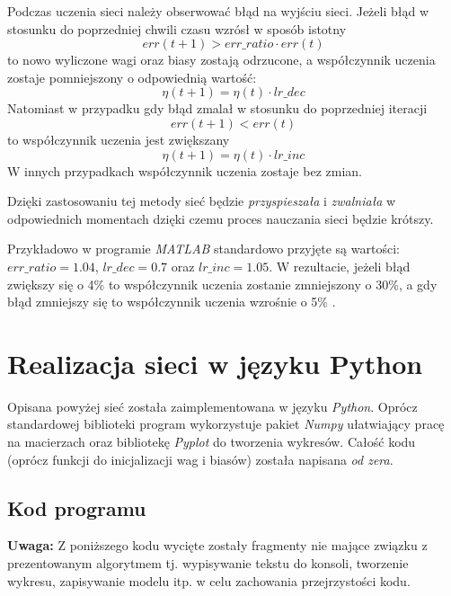 \documentclass[a4paper,12pt]{article}
\numberwithin{equation}{section}
\begin{document}
Podczas uczenia sieci należy obserwować błąd na wyjściu sieci. Jeżeli błąd w stosunku do poprzedniej chwili czasu wzrósł w sposób istotny
\begin{equation}
    err(t+1) > err\_ratio \cdot err(t)
\end{equation}
to nowo wyliczone wagi oraz biasy zostają odrzucone, a współczynnik uczenia zostaje pomniejszony o odpowiednią wartość:
\begin{equation}
    \eta(t+1) = \eta(t) \cdot lr\_dec
\end{equation}
Natomiast w przypadku gdy błąd zmalał w stosunku do poprzedniej iteracji
\begin{equation}
    err(t+1) < err(t)
\end{equation}
to współczynnik uczenia jest zwiększany
\begin{equation}
    \eta(t+1) = \eta(t) \cdot lr\_inc
\end{equation}
W innych przypadkach współczynnik uczenia zostaje bez zmian.

Dzięki zastosowaniu tej metody sieć będzie \textit{przyspieszała} i \textit{zwalniała} w odpowiednich momentach dzięki czemu proces nauczania sieci będzie krótszy.

Przykładowo w programie \textit{MATLAB} standardowo przyjęte są wartości:\\
$err\_ratio=1.04$, $lr\_dec=0.7$ oraz $lr\_inc=1.05$. W rezultacie, jeżeli błąd zwiększy się o 4\% to współczynnik uczenia zostanie zmniejszony o 30\%, a gdy błąd zmniejszy się to współczynnik uczenia wzrośnie o 5\% \cite{mathworks_adaptive}.


\section{Realizacja sieci w języku Python}
Opisana powyżej sieć została zaimplementowana w języku \textit{Python}. Oprócz standardowej biblioteki program wykorzystuje pakiet \textit{Numpy} ułatwiający pracę na macierzach oraz bibliotekę \textit{Pyplot} do tworzenia wykresów. Całość kodu (oprócz funkcji do inicjalizacji wag i biasów) została napisana \textit{od zera}.

\subsection{Kod programu}
\noindent
\textbf{Uwaga:} Z poniższego kodu wycięte zostały fragmenty nie mające związku z prezentowanym algorytmem tj. wypisywanie tekstu do konsoli, tworzenie wykresu, zapisywanie modelu itp. w celu zachowania przejrzystości kodu.
\end{document}
